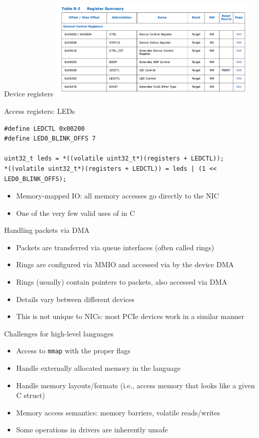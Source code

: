 \documentclass[NET,english,aspectratio=169,notitleframe]{tumbeamer}
\begin{document}
\begin{frame}{Device registers}
\centering\includegraphics[width=0.75\textwidth]{pics/registers}
\end{frame}

\begin{frame}[fragile=singleslide]{Access registers: LEDs}
\begin{verbatim}
#define LEDCTL 0x00200
#define LED0_BLINK_OFFS 7

uint32_t leds = *((volatile uint32_t*)(registers + LEDCTL));
*((volatile uint32_t*)(registers + LEDCTL)) = leds | (1 << LED0_BLINK_OFFS);
\end{verbatim}
\begin{itemize}
\item Memory-mapped IO: all memory accesses go directly to the NIC
\item One of the very few valid uses of  in C
\end{itemize}
\end{frame}


\begin{frame}{Handling packets via DMA}
\begin{itemize}
\item Packets are transferred via queue interfaces (often called rings)
\item Rings are configured via MMIO and accessed via by the device DMA
\item Rings (usually) contain pointers to packets, also accessed via DMA
\pause
\vspace{1em}
\item Details vary between different devices
\item This is not unique to NICs: most PCIe devices work in a similar manner
\end{itemize}
\end{frame}


\begin{frame}{Challenges for high-level languages}
\begin{itemize}
\item Access to \texttt{mmap} with the proper flags
\item Handle externally allocated memory in the language
\item Handle memory layouts/formats (i.e., access memory that looks like a given C struct)
\item Memory access semantics: memory barriers, volatile reads/writes
\item Some operations in drivers are inherently unsafe
\end{itemize}
\end{frame}
\end{document}
